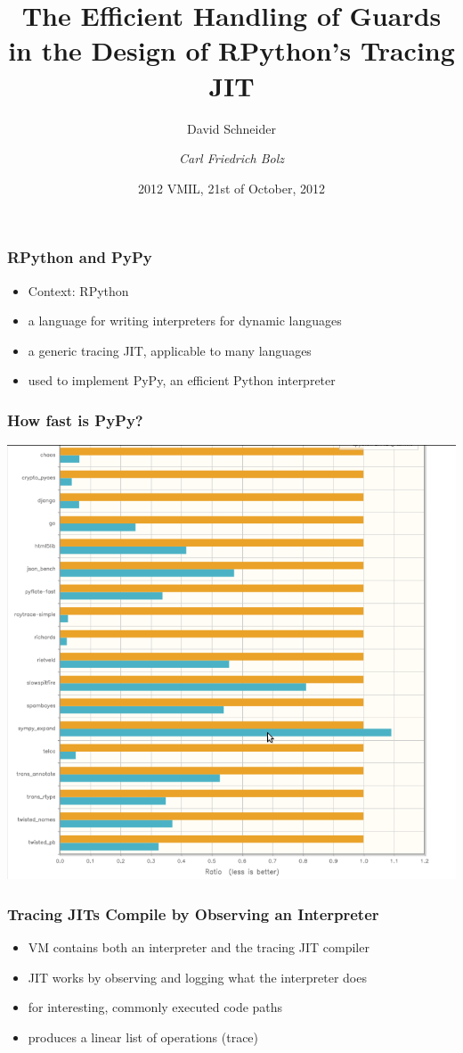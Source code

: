 \documentclass[utf8x]{beamer}
\title[Guards in RPython's Tracing JIT]{The Efficient Handling of Guards in the Design of RPython's Tracing JIT}
\author[David Schneider, Carl Friedrich Bolz]{David Schneider \and \emph{Carl Friedrich Bolz}}
\institute[Heinrich-Heine-Universität Düsseldorf]{
Heinrich-Heine-Universität Düsseldorf, STUPS Group, Germany
}
\date{2012 VMIL, 21st of October, 2012}
\begin{document}
\begin{frame}
  \titlepage
\end{frame}


\begin{frame}
  \frametitle{RPython and PyPy}
  \begin{itemize}
      \item Context: RPython
      \item a language for writing interpreters for dynamic languages
      \item a generic tracing JIT, applicable to many languages
      \item used to implement PyPy, an efficient Python interpreter
  \end{itemize}
\end{frame}

\begin{frame}
  \frametitle{How fast is PyPy?}
  \includegraphics[scale=0.3]{figures/all_numbers.png}
\end{frame}

\begin{frame}
  \frametitle{Tracing JITs Compile by Observing an Interpreter}
  \begin{itemize}
      \item VM contains both an interpreter and the tracing JIT compiler
      \item JIT works by observing and logging what the interpreter does
      \item for interesting, commonly executed code paths
      \item produces a linear list of operations (trace)
  \end{itemize}
\end{frame}
\end{document}
